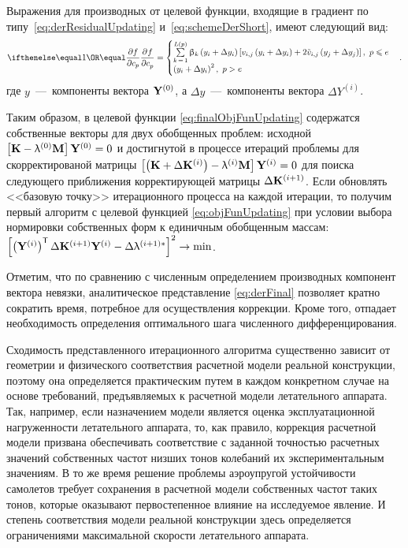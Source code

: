 Выражения для производных от целевой функции, входящие в градиент по типу~\eqref{eq:derResidualUpdating} и~\eqref{eq:schemeDerShort}, имеют следующий вид:
\begin{equation}
	\partDer{f}{c_p}{} = 
	\begin{cases}
		\sum\limits_{k\,=\,1} ^ {L(p)} \beta_k \rbrackets{y_i + \Delta y_i} \sbrackets{v_{i, j} \rbrackets{y_i + \Delta y_i} + 2 \tilde{v}_{i, j} \rbrackets{y_j + \Delta y_j}}, \ p \leq e \\
		\rbrackets{y_i + \Delta y_i} ^ 2, \ p > e
	\end{cases} \label{eq:derFinal}.
\end{equation}
где $ y $~---~компоненты вектора $ \mathbf{Y} ^ {(0)} $, а $ \Delta y $~---~компоненты вектора $ \Delta Y ^ {(i)} $.

Таким образом, в целевой функции \eqref{eq:finalObjFunUpdating} содержатся собственные векторы для двух обобщенных проблем: исходной $ \left[ \mathbf{K} - \uplambda ^ {(0)} \mathbf{M} \right] \mathbf{Y} ^ {(0)} = 0 $ и достигнутой в процессе итераций проблемы для скорректированой матрицы $ \left[ \left( \mathbf{K} + \Delta \mathbf{K} ^ {(i)} \right) - \uplambda ^ {(i)} \mathbf{M} \right] \mathbf{Y} ^ {(i)} = 0 $ для поиска следующего приближения корректирующей матрицы $ \Delta \mathbf{K} ^ {(i + 1)} $. Если обновлять <<базовую точку>> итерационного процесса на каждой итерации, то получим первый алгоритм с целевой функцией \eqref{eq:objFunUpdating} при условии выбора нормировки собственных форм к единичным обобщенным массам: $ \left[ \left( \mathbf{Y} ^ {(i)} \right) ^ \mathsf{T} \Delta \mathbf{K} ^ {(i + 1)} \mathbf{Y} ^ {(i)} - \Delta \uplambda ^ {(i + 1) \ast} \right] ^ 2 \rightarrow \min $.

Отметим, что по сравнению с численным определением производных компонент вектора невязки, аналитическое представление \eqref{eq:derFinal} позволяет кратно сократить время, потребное для осуществления коррекции. Кроме того, отпадает необходимость определения оптимального шага численного дифференцирования.

Сходимость представленного итерационного алгоритма существенно зависит от геометрии и физического соответствия расчетной модели реальной конструкции, поэтому она определяется практическим путем в каждом конкретном случае на основе требований, предъявляемых к расчетной модели летательного аппарата. Так, например, если назначением модели является оценка эксплуатационной нагруженности летательного аппарата, то, как правило, коррекция расчетной модели призвана обеспечивать соответствие с заданной точностью расчетных значений собственных частот низших тонов колебаний их экспериментальным значениям. В то же время решение проблемы аэроупругой устойчивости самолетов требует сохранения в расчетной модели собственных частот таких тонов, которые оказывают первостепенное влияние на исследуемое явление. И степень соответствия модели реальной конструкции здесь определяется ограничениями максимальной скорости летательного аппарата.

